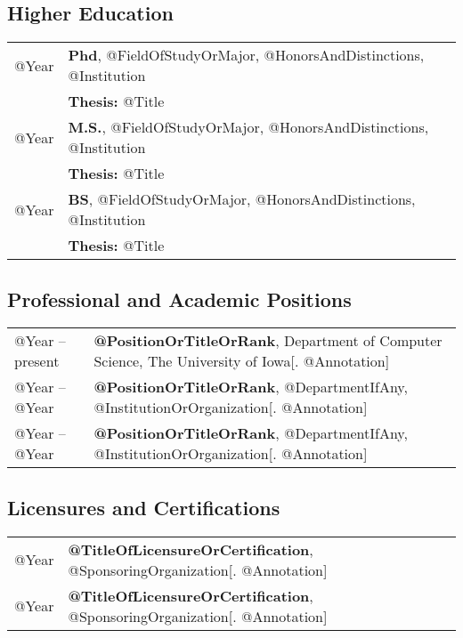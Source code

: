 \documentclass[10pt]{article}
\begin{document}
\subsection*{Higher Education}
\smallskip

\quad
\begin{tabular}{l@{\quad\ }l}
 @Year  
 & {\bf Phd}, @FieldOfStudyOrMajor, @HonorsAndDistinctions, @Institution \\
 & {\bf Thesis:} @Title
 \\[.5ex]
 @Year  
 & {\bf M.S.}, @FieldOfStudyOrMajor, @HonorsAndDistinctions, @Institution \\
 & {\bf Thesis:} @Title
 \\[.5ex]
 @Year  
 & {\bf BS}, @FieldOfStudyOrMajor, @HonorsAndDistinctions, @Institution \\
 & {\bf Thesis:} @Title
 \\[.5ex]
\end{tabular}


\subsection*{Professional and Academic Positions}
\smallskip

\quad
\begin{tabular}{l@{\quad\ }p{35em}}
 @Year -- present
 & {\bf @PositionOrTitleOrRank}, Department of Computer Science, 
   The University of Iowa[. @Annotation]
 \\[3.5ex]
 @Year -- @Year
 & {\bf @PositionOrTitleOrRank}, @DepartmentIfAny, 
   @InstitutionOrOrganization[. @Annotation]
 \\[3.5ex]
 @Year -- @Year
 & {\bf @PositionOrTitleOrRank}, @DepartmentIfAny, 
   @InstitutionOrOrganization[. @Annotation]
 \\[3.5ex]
\end{tabular}


\subsection*{Licensures and Certifications}
\smallskip

\quad
\begin{tabular}{l@{\quad\ }l}
 @Year
 & {\bf @TitleOfLicensureOrCertification}, @SponsoringOrganization[. @Annotation]
 \\[.5ex]
 @Year  
 & {\bf @TitleOfLicensureOrCertification}, @SponsoringOrganization[. @Annotation]
 \\[.5ex]
\end{tabular}
\end{document}
